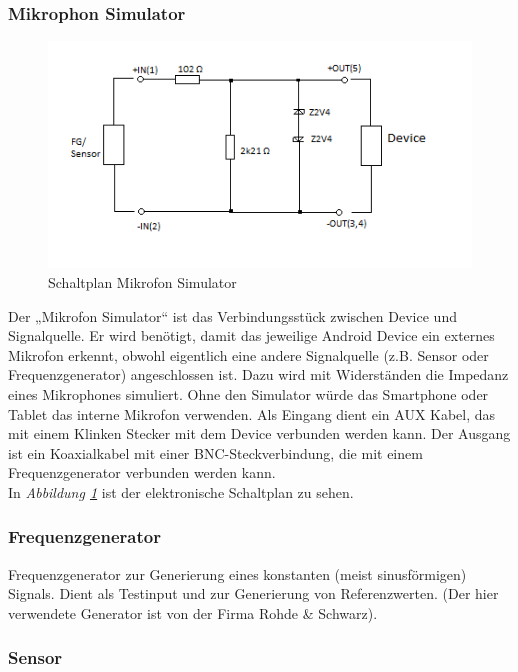 \documentclass{article}
\begin{document}
{		\subsubsection{Mikrophon Simulator}
			\begin{figure}
				\includegraphics[scale=0.8]{Bilder/Schaltplan.png}
				\centering
				\vspace{0 cm}
				\caption{Schaltplan Mikrofon Simulator}
				\label{fig2}	
			\end{figure}

			Der „Mikrofon Simulator“ ist das Verbindungsstück zwischen Device und Signalquelle. Er wird benötigt, damit das jeweilige Android Device ein externes Mikrofon erkennt, obwohl eigentlich eine andere Signalquelle (z.B. Sensor oder Frequenzgenerator) angeschlossen ist.
			Dazu wird mit Widerständen die Impedanz eines Mikrophones simuliert. Ohne den Simulator würde das Smartphone oder Tablet das interne Mikrofon verwenden.
			Als Eingang dient ein AUX Kabel, das mit einem Klinken Stecker mit dem Device verbunden werden kann. Der Ausgang ist ein Koaxialkabel mit einer BNC-Steckverbindung, die mit einem Frequenzgenerator verbunden werden kann.\\
			In \textit{Abbildung \ref{fig2}} ist der elektronische Schaltplan zu sehen.

		\subsubsection{Frequenzgenerator}
			Frequenzgenerator zur Generierung eines konstanten (meist sinusförmigen) Signals. Dient als Testinput und zur Generierung von Referenzwerten.
			(Der hier verwendete Generator ist von der Firma Rohde \& Schwarz).

		\subsubsection{Sensor}

}
\end{document}
